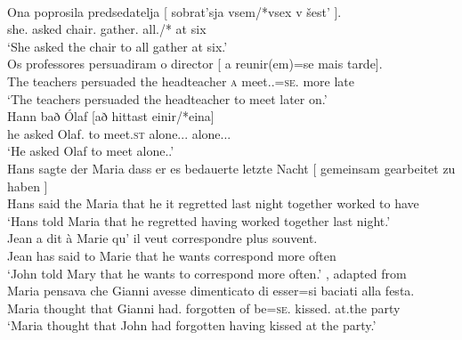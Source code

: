 \documentclass[output=paper]{langsci/langscibook}
\begin{document}
\ea\label{ex:24.2}  \parencite[909]{Landau2008}\\
	\gll    Ona   poprosila   predsedatelja [ sobrat’sja   vsem/*vsex   v šest’ ].\\
    she.\Nom{}   asked  chair.\Acc{} {} gather.\Inf{}   all.\Dat{}/*\Acc{}  at six\\
	\glt    ‘She asked the chair to all gather at six.’
\ex\label{ex:24.3}  \parencite[34]{Sheehan2018b}\\
	\gll Os professores   persuadiram   o director  [ a    reunir(em)=se     mais tarde].\\
    The teachers   persuaded   the headteacher {} \textsc{a} meet.\Inf{}.\Tpl=\textsc{se}.\Third{}   more late\\
	\glt ‘The teachers persuaded the headteacher to meet later on.’
\ex\label{ex:24.4}  \parencite[149]{Sheehan2018b}\\
	\gll Hann bað    Ólaf     [að   hittast     einir/*eina]\\
    he      asked Olaf.\Acc{}    to  meet.\textsc{st}   alone.\Nom.\M.\Pl{} alone.\Acc.\M.\Pl{}\\
	\glt ‘He asked Olaf to meet alone.\Pl{}.’
\ex\label{ex:24.5}  \parencite[45]{Landau2000}\\
	\gll Hans sagte der Maria dass er  es   bedauerte   letzte Nacht [ gemeinsam   gearbeitet   zu haben ]\\
    Hans said   the Maria that    he it   regretted   last night {} together     worked   to have\\
	\glt ‘Hans told Maria that he regretted having worked together last night.’
\ex\label{ex:24.6}  \parencite[85]{Landau2000}\\
	\gll Jean a    dit      à Marie  qu’   il  veut    correspondre plus  souvent.\\
		Jean has said   to Marie that he wants correspond    more often\\
	\glt ‘John told Mary that he wants to correspond more often.’\pagebreak
\ex\label{ex:24.7} , adapted from \parencite[46]{Landau2000}\\
	\gll Maria pensava che Gianni avesse dimenticato di esser=si baciati alla festa.\\
		Maria thought that Gianni had.\Sbjv{} forgotten of be=\textsc{se}.\Third{} kissed.\Pl{} at.the party\\
	\glt ‘Maria thought that John had forgotten having kissed at the party.’
\z
\end{document}
